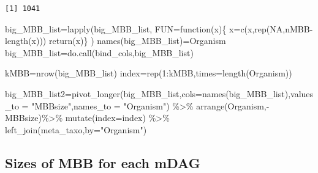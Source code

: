 \documentclass[
  letterpaper,
  DIV=11,
  numbers=noendperiod]{scrreprt}
\newenvironment{Shaded}{\begin{snugshade}}{\end{snugshade}}
\newcommand{\AttributeTok}[1]{\textcolor[rgb]{0.40,0.45,0.13}{#1}}
\newcommand{\ConstantTok}[1]{\textcolor[rgb]{0.56,0.35,0.01}{#1}}
\newcommand{\ControlFlowTok}[1]{\textcolor[rgb]{0.00,0.23,0.31}{#1}}
\newcommand{\DecValTok}[1]{\textcolor[rgb]{0.68,0.00,0.00}{#1}}
\newcommand{\FunctionTok}[1]{\textcolor[rgb]{0.28,0.35,0.67}{#1}}
\newcommand{\NormalTok}[1]{\textcolor[rgb]{0.00,0.23,0.31}{#1}}
\newcommand{\OtherTok}[1]{\textcolor[rgb]{0.00,0.23,0.31}{#1}}
\newcommand{\SpecialCharTok}[1]{\textcolor[rgb]{0.37,0.37,0.37}{#1}}
\newcommand{\StringTok}[1]{\textcolor[rgb]{0.13,0.47,0.30}{#1}}
\begin{document}
\begin{verbatim}
[1] 1041
\end{verbatim}

\begin{Shaded}
\begin{Highlighting}[]
\NormalTok{big\_MBB\_list}\OtherTok{=}\FunctionTok{lapply}\NormalTok{(big\_MBB\_list,}
                    \AttributeTok{FUN=}\ControlFlowTok{function}\NormalTok{(x)\{}
\NormalTok{                      x}\OtherTok{=}\FunctionTok{c}\NormalTok{(x,}\FunctionTok{rep}\NormalTok{(}\ConstantTok{NA}\NormalTok{,nMBB}\SpecialCharTok{{-}}\FunctionTok{length}\NormalTok{(x)))}
                      \FunctionTok{return}\NormalTok{(x)\}}
\NormalTok{)}
\FunctionTok{names}\NormalTok{(big\_MBB\_list)}\OtherTok{=}\NormalTok{Organism}
\NormalTok{big\_MBB\_list}\OtherTok{=}\FunctionTok{do.call}\NormalTok{(bind\_cols,big\_MBB\_list)}

\NormalTok{kMBB}\OtherTok{=}\FunctionTok{nrow}\NormalTok{(big\_MBB\_list)}
\NormalTok{index}\OtherTok{=}\FunctionTok{rep}\NormalTok{(}\DecValTok{1}\SpecialCharTok{:}\NormalTok{kMBB,}\AttributeTok{times=}\FunctionTok{length}\NormalTok{(Organism))}

\NormalTok{big\_MBB\_list2}\OtherTok{=}\FunctionTok{pivot\_longer}\NormalTok{(big\_MBB\_list,}\AttributeTok{cols=}\FunctionTok{names}\NormalTok{(big\_MBB\_list),}\AttributeTok{values\_to =} \StringTok{"MBBsize"}\NormalTok{,}\AttributeTok{names\_to =} \StringTok{"Organism"}\NormalTok{) }\SpecialCharTok{\%\textgreater{}\%} \FunctionTok{arrange}\NormalTok{(Organism,}\SpecialCharTok{{-}}\NormalTok{MBBsize)}\SpecialCharTok{\%\textgreater{}\%}  \FunctionTok{mutate}\NormalTok{(}\AttributeTok{index=}\NormalTok{index) }\SpecialCharTok{\%\textgreater{}\%}  \FunctionTok{left\_join}\NormalTok{(meta\_taxo,}\AttributeTok{by=}\StringTok{"Organism"}\NormalTok{)}
\end{Highlighting}
\end{Shaded}

\hypertarget{sizes-of-mbb-for-each-mdag}{%
\subsection*{Sizes of MBB for each
mDAG}\label{sizes-of-mbb-for-each-mdag}}
\end{document}
